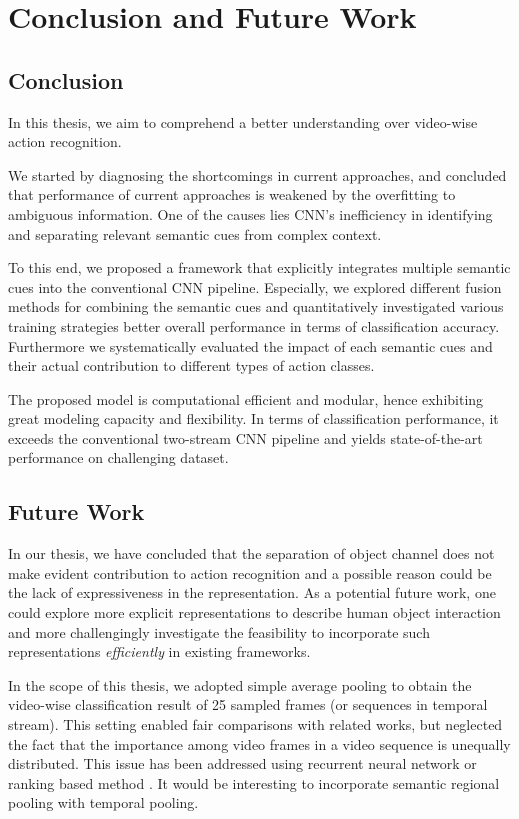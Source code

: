 
\chapter{Conclusion and Future Work}\label{chap:conclusion}
\section{Conclusion}
In this thesis, we aim to comprehend a better understanding over video-wise action recognition.

We started by diagnosing the shortcomings in current approaches, and concluded that performance of current approaches is weakened by the overfitting to ambiguous information. 
One of the causes lies CNN's inefficiency in identifying and separating relevant semantic cues from complex context.

To this end, we proposed a framework that explicitly integrates multiple semantic cues into the conventional CNN pipeline. 
Especially, we explored different fusion methods for combining the semantic cues and quantitatively investigated various training strategies better overall performance in terms of classification accuracy.
Furthermore we systematically evaluated the impact of each semantic cues and their actual contribution to different types of action classes.

The proposed model is computational efficient and modular, hence exhibiting great modeling capacity and flexibility.
In terms of classification performance, it exceeds the conventional two-stream CNN pipeline and yields state-of-the-art performance on challenging dataset.
\section{Future Work}
In our thesis, we have concluded that the separation of object channel does not make evident contribution to action recognition and a possible reason could be the lack of expressiveness in the representation.
As a potential future work, one could explore more explicit representations to describe human object interaction and more challengingly investigate the feasibility to incorporate such representations \textit{efficiently} in existing frameworks.

In the scope of this thesis, we adopted simple average pooling to obtain the video-wise classification result of 25 sampled frames (or sequences in temporal stream).
This setting enabled fair comparisons with related works, but neglected the fact that the importance among video frames in a video sequence is unequally distributed.
This issue has been addressed using recurrent neural network \cite{donahue2015long} or ranking based method \cite{fernando2015modeling}.
It would be interesting to incorporate semantic regional pooling with temporal pooling.

